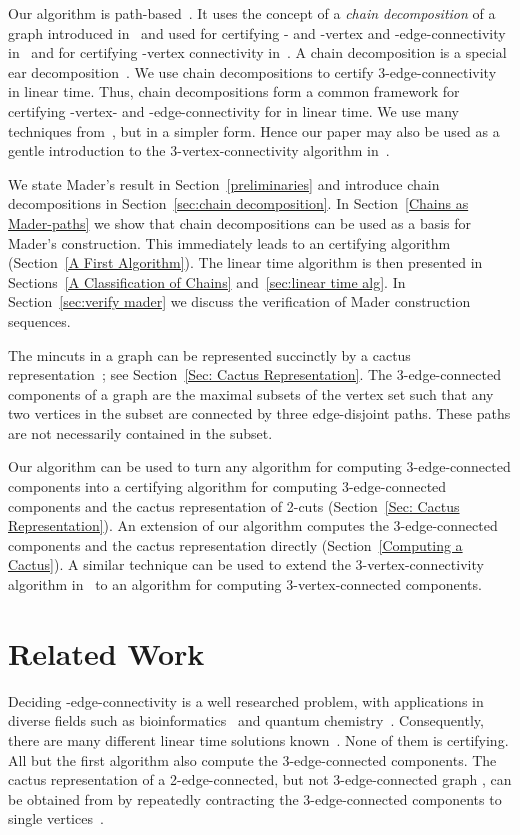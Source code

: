 \documentclass[paper=a4]{scrartcl}
\begin{document}
Our algorithm is path-based~\cite{Gabow2000}. It uses the concept of a \emph{chain decomposition} of a graph introduced in~\cite{Schmidt2010b} and used for certifying - and -vertex and -edge-connectivity in~\cite{Schmidt2013a} and for certifying -vertex connectivity in~\cite{Schmidt2013}. 
A chain decomposition is a special ear decomposition~\cite{Lovasz1985}. 
We use chain decompositions to certify 3-edge-connectivity in linear time. Thus, chain decompositions form a common framework for certifying -vertex- and -edge-connectivity for  in linear time. We use many techniques from~\cite{Schmidt2013}, but in a simpler form. Hence our paper may also be used as a gentle introduction to the 3-vertex-connectivity algorithm in~\cite{Schmidt2013}.

We state Mader's result in Section~\ref{preliminaries} and introduce chain decompositions in Section~\ref{sec:chain decomposition}. In Section~\ref{Chains as Mader-paths} we show that chain decompositions can be used as a basis for Mader's construction. This immediately leads to an  certifying algorithm (Section~\ref{A First Algorithm}). The linear time algorithm is then presented in Sections~\ref{A Classification of Chains} and~\ref{sec:linear time alg}. In Section~\ref{sec:verify mader} we discuss the verification of Mader construction sequences.

The mincuts in a graph can be represented succinctly by a cactus representation~\cite{Dinits-Karzanov-Lomonosov,Nagamochi-Ibaraki-Book,Fleiner2009}; see Section~\ref{Sec: Cactus Representation}. The 3-edge-connected components of a graph are the maximal subsets of the vertex set such that any two vertices in the subset are connected by three edge-disjoint paths. These paths are not necessarily contained in the subset. 

Our algorithm can be used to turn any algorithm for computing 3-edge-connected components into a certifying algorithm for computing 3-edge-connected components and the cactus representation of 2-cuts (Section~\ref{Sec: Cactus Representation}). An extension of our algorithm computes the 3-edge-connected components and the cactus representation directly (Section~\ref{Computing a Cactus}).  A similar technique can be used to extend the 3-vertex-connectivity algorithm in~\cite{Schmidt2013} to an algorithm for computing 3-vertex-connected components.

\section{Related Work}
Deciding -edge-connectivity is a well researched problem, with applications in diverse fields such as bioinformatics~\cite{dehne2006cluster} and quantum chemistry~\cite{corcoran2006perfect}. Consequently, there are many different linear time solutions known~\cite{Galil1991,Nagamochi1992a,Taoka1992,Tsin2007,Tsin2009,Nagamochi-Ibaraki-Book}. None of them is certifying. All but the first algorithm also compute the 3-edge-connected components. The cactus representation of a 2-edge-connected, but not 3-edge-connected graph , can be obtained from  by repeatedly contracting the 3-edge-connected components to single vertices~\cite{Nagamochi-Ibaraki-Book}.
\end{document}
